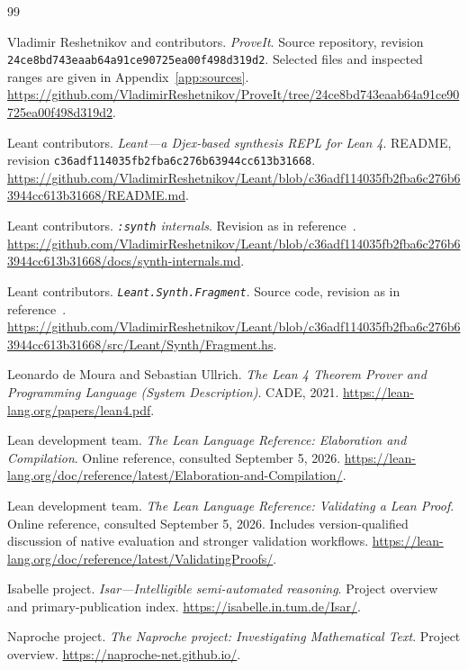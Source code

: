 \documentclass[11pt,a4paper]{article}
\theoremstyle{remark}
\begin{document}
\clearpage
{}
{}
\begin{thebibliography}{99}
\small\raggedright
{}
Vladimir Reshetnikov and contributors.
\emph{ProveIt}. Source repository, revision
\texttt{24ce8bd743eaab64a91ce90725ea00f498d319d2}.
Selected files and inspected ranges are given in Appendix~\ref{app:sources}.
\url{https://github.com/VladimirReshetnikov/ProveIt/tree/24ce8bd743eaab64a91ce90725ea00f498d319d2}.

Leant contributors.
\emph{Leant---a Djex-based synthesis REPL for Lean 4}. README, revision
\texttt{c36adf114035fb2fba6c276b63944cc613b31668}.
\url{https://github.com/VladimirReshetnikov/Leant/blob/c36adf114035fb2fba6c276b63944cc613b31668/README.md}.

Leant contributors.
\emph{\texttt{:synth} internals}. Revision as in reference~\cite{leant-readme}.
\url{https://github.com/VladimirReshetnikov/Leant/blob/c36adf114035fb2fba6c276b63944cc613b31668/docs/synth-internals.md}.

Leant contributors.
\emph{\texttt{Leant.Synth.Fragment}}. Source code, revision as in reference~\cite{leant-readme}.
\url{https://github.com/VladimirReshetnikov/Leant/blob/c36adf114035fb2fba6c276b63944cc613b31668/src/Leant/Synth/Fragment.hs}.

Leonardo de Moura and Sebastian Ullrich.
\emph{The Lean 4 Theorem Prover and Programming Language (System Description)}.
CADE, 2021.
\url{https://lean-lang.org/papers/lean4.pdf}.

Lean development team.
\emph{The Lean Language Reference: Elaboration and Compilation}.
Online reference, consulted September 5, 2026.
\url{https://lean-lang.org/doc/reference/latest/Elaboration-and-Compilation/}.

Lean development team.
\emph{The Lean Language Reference: Validating a Lean Proof}.
Online reference, consulted September 5, 2026. Includes version-qualified discussion of native evaluation and stronger validation workflows.
\url{https://lean-lang.org/doc/reference/latest/ValidatingProofs/}.

Isabelle project.
\emph{Isar---Intelligible semi-automated reasoning}.
Project overview and primary-publication index.
\url{https://isabelle.in.tum.de/Isar/}.

Naproche project.
\emph{The Naproche project: Investigating Mathematical Text}.
Project overview.
\url{https://naproche-net.github.io/}.


\end{thebibliography}
\end{document}
